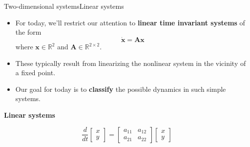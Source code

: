 \documentclass[usenames,dvipsnames,svgnames,10pt,aspectratio=169]{beamer}
\begin{document}
\begin{frame}[t, c]{Two-dimensional systems}{Linear systems}
  \begin{minipage}{.68\textwidth}
    \begin{itemize}
    \item For today, we'll restrict our attention to \textbf{linear time invariant systems} of the form
      \[
      \dot{\bm{x}} = \bm{Ax}
      \]
      where $\bm{x} \in \mathbb{R}^2$ and $\bm{A} \in \mathbb{R}^{2 \times 2}$.

      \bigskip

    \item These typically result from linearizing the nonlinear system in the vicinity of a fixed point.

      \bigskip

    \item Our goal for today is to \textbf{classify} the possible dynamics in such simple systems.
    \end{itemize}
  \end{minipage}%
  \hfill
  \begin{minipage}{.28\textwidth}
    \centering
    \textbf{Linear systems}

    \[
    \dfrac{d}{dt} \begin{bmatrix} x \\ y \end{bmatrix}
    =
    \begin{bmatrix}
      a_{11} & a_{12} \\
      a_{21} & a_{22}
    \end{bmatrix}
    \begin{bmatrix}
      x \\ y
    \end{bmatrix}
    \]
  \end{minipage}

  \vspace{1cm}
\end{frame}
\end{document}
